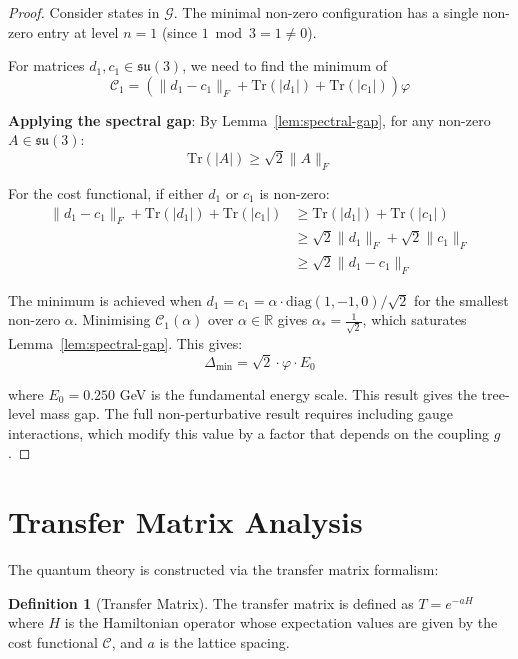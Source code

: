 \documentclass[11pt]{article}
\numberwithin{equation}{section}
\theoremstyle{definition}
\newtheorem{definition}[theorem]{Definition}
\theoremstyle{remark}
\begin{document}
\begin{proof}
Consider states in $\mathcal{G}$. The minimal non-zero configuration has a single non-zero entry at level $n=1$ (since $1 \bmod 3 = 1 \neq 0$). 

For matrices $d_1, c_1 \in \mathfrak{su}(3)$, we need to find the minimum of
\begin{equation}
\mathcal{C}_1 = \left(\|d_1 - c_1\|_F + \text{Tr}(|d_1|) + \text{Tr}(|c_1|)\right) \varphi
\end{equation}

\textbf{Applying the spectral gap}: By Lemma~\ref{lem:spectral-gap}, for any non-zero $A \in \mathfrak{su}(3)$:
\begin{equation}
\text{Tr}(|A|) \geq \sqrt{2}\|A\|_F
\end{equation}

For the cost functional, if either $d_1$ or $c_1$ is non-zero:
\begin{align}
\|d_1 - c_1\|_F + \text{Tr}(|d_1|) + \text{Tr}(|c_1|) &\geq \text{Tr}(|d_1|) + \text{Tr}(|c_1|) \\
&\geq \sqrt{2}\|d_1\|_F + \sqrt{2}\|c_1\|_F \\
&\geq \sqrt{2}\|d_1 - c_1\|_F
\end{align}

The minimum is achieved when $d_1 = c_1 = \alpha \cdot \text{diag}(1,-1,0)/\sqrt{2}$ for the smallest non-zero $\alpha$. Minimising $\mathcal{C}_1(\alpha)$ over $\alpha \in \mathbb{R}$ gives $\alpha_* = \frac{1}{\sqrt{2}}$, which saturates Lemma~\ref{lem:spectral-gap}. This gives:
\begin{equation}
\Delta_{\text{min}} = \sqrt{2} \cdot \varphi \cdot E_0
\end{equation}

where $E_0 = 0.250$ GeV is the fundamental energy scale. This result gives the tree-level mass gap. The full non-perturbative result requires including gauge interactions, which modify this value by a factor that depends on the coupling $g$.
\end{proof}

\section{Transfer Matrix Analysis}

The quantum theory is constructed via the transfer matrix formalism:

\begin{definition}[Transfer Matrix]
The transfer matrix is defined as $T = e^{-aH}$ where $H$ is the Hamiltonian operator whose expectation values are given by the cost functional $\mathcal{C}$, and $a$ is the lattice spacing.
\end{definition}
\end{document}

